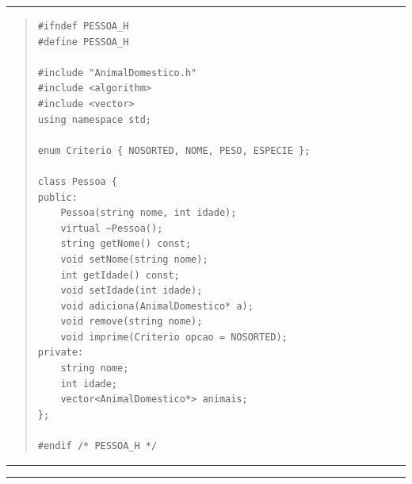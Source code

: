 \documentclass[12pt]{article}
\begin{document}
\par\noindent\rule{\textwidth}{0.4pt}

\begin{quote}
\begin{scriptsize}
\begin{verbatim}
#ifndef PESSOA_H
#define PESSOA_H

#include "AnimalDomestico.h"
#include <algorithm>
#include <vector>
using namespace std;

enum Criterio { NOSORTED, NOME, PESO, ESPECIE };

class Pessoa {
public:
    Pessoa(string nome, int idade);
    virtual ~Pessoa();
    string getNome() const;
    void setNome(string nome);
    int getIdade() const;
    void setIdade(int idade);
    void adiciona(AnimalDomestico* a);
    void remove(string nome);
    void imprime(Criterio opcao = NOSORTED);
private:
    string nome;
    int idade;
    vector<AnimalDomestico*> animais;
};

#endif /* PESSOA_H */
\end{verbatim}
\end{scriptsize}
\end{quote}

\par\noindent\rule{\textwidth}{0.4pt}

\newpage

\par\noindent\rule{\textwidth}{0.4pt}
\end{document}

